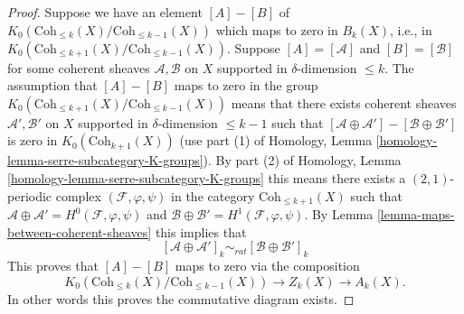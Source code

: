 \begin{proof}
Suppose we have an element $[A] - [B]$ of
$K_0(\text{Coh}_{\leq k}(X)/\text{Coh}_{\leq k - 1}(X))$
which maps to zero in $B_k(X)$, i.e., in
$K_0(\text{Coh}_{\leq k + 1}(X)/\text{Coh}_{\leq k - 1}(X))$.
Suppose $[A] = [\mathcal{A}]$ and $[B] = [\mathcal{B}]$
for some coherent sheaves $\mathcal{A}, \mathcal{B}$ on
$X$ supported in $\delta$-dimension $\leq k$.
The assumption that $[A] - [B]$ maps to zero in the group
$K_0(\text{Coh}_{\leq k + 1}(X)/\text{Coh}_{\leq k - 1}(X))$
means that there exists coherent sheaves
$\mathcal{A}', \mathcal{B}'$ on $X$ supported in
$\delta$-dimension $\leq k - 1$ such that
$[\mathcal{A} \oplus \mathcal{A}'] - [\mathcal{B} \oplus \mathcal{B}']$
is zero in $K_0(\text{Coh}_{k + 1}(X))$ (use part (1) of
Homology, Lemma \ref{homology-lemma-serre-subcategory-K-groups}).
By part (2) of
Homology, Lemma \ref{homology-lemma-serre-subcategory-K-groups}
this means there exists a $(2, 1)$-periodic complex
$(\mathcal{F}, \varphi, \psi)$ in the category $\text{Coh}_{\leq k + 1}(X)$
such that
$\mathcal{A} \oplus \mathcal{A}' = H^0(\mathcal{F}, \varphi, \psi)$
and $\mathcal{B} \oplus \mathcal{B}' = H^1(\mathcal{F}, \varphi, \psi)$.
By Lemma \ref{lemma-maps-between-coherent-sheaves}
this implies that
$$
[\mathcal{A} \oplus \mathcal{A}']_k
\sim_{rat}
[\mathcal{B} \oplus \mathcal{B}']_k
$$
This proves that $[A] - [B]$ maps to zero via the composition
$$
K_0(\text{Coh}_{\leq k}(X)/\text{Coh}_{\leq k - 1}(X))
\longrightarrow Z_k(X)
\longrightarrow A_k(X).
$$
In other words this proves the
commutative diagram exists.


\end{proof}
